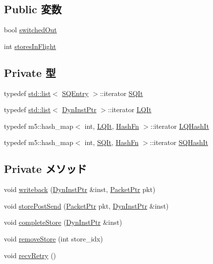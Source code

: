 \subsection*{Public 変数}
\begin{DoxyCompactItemize}
\item 
bool \hyperlink{classOzoneLWLSQ_a1aee6db9bfb75cf02e38a82e5d02847f}{switchedOut}
\item 
int \hyperlink{classOzoneLWLSQ_a04638dcfe9b4f8584453bb178bd2da5e}{storesInFlight}
\end{DoxyCompactItemize}
\subsection*{Private 型}
\begin{DoxyCompactItemize}
\item 
typedef \hyperlink{classstd_1_1list}{std::list}$<$ \hyperlink{structOzoneLWLSQ_1_1SQEntry}{SQEntry} $>$::iterator \hyperlink{classOzoneLWLSQ_a3b2dd16f487adc977c43201cd7f51558}{SQIt}
\item 
typedef \hyperlink{classstd_1_1list}{std::list}$<$ \hyperlink{classOzoneLWLSQ_a028ce10889c5f6450239d9e9a7347976}{DynInstPtr} $>$::iterator \hyperlink{classOzoneLWLSQ_a363c8c15e054d23b34f72063429933b8}{LQIt}
\item 
typedef m5::hash\_\-map$<$ int, \hyperlink{classOzoneLWLSQ_a363c8c15e054d23b34f72063429933b8}{LQIt}, \hyperlink{structOzoneLWLSQ_1_1HashFn}{HashFn} $>$::iterator \hyperlink{classOzoneLWLSQ_ac0ca3d8ca19168e251c7233ec1f9a171}{LQHashIt}
\item 
typedef m5::hash\_\-map$<$ int, \hyperlink{classOzoneLWLSQ_a3b2dd16f487adc977c43201cd7f51558}{SQIt}, \hyperlink{structOzoneLWLSQ_1_1HashFn}{HashFn} $>$::iterator \hyperlink{classOzoneLWLSQ_af476de7b08376a4d7d7cd4b8dbbabb7a}{SQHashIt}
\end{DoxyCompactItemize}
\subsection*{Private メソッド}
\begin{DoxyCompactItemize}
\item 
void \hyperlink{classOzoneLWLSQ_a3911bacb8817c31cfbeefd125dba0217}{writeback} (\hyperlink{classOzoneLWLSQ_a028ce10889c5f6450239d9e9a7347976}{DynInstPtr} \&inst, \hyperlink{classPacket}{PacketPtr} pkt)
\item 
void \hyperlink{classOzoneLWLSQ_af841afeea43eb2b2272f0dfaf17c3f4e}{storePostSend} (\hyperlink{classPacket}{PacketPtr} pkt, \hyperlink{classOzoneLWLSQ_a028ce10889c5f6450239d9e9a7347976}{DynInstPtr} \&inst)
\item 
void \hyperlink{classOzoneLWLSQ_a14bf528b217d02373076ed257f448dbf}{completeStore} (\hyperlink{classOzoneLWLSQ_a028ce10889c5f6450239d9e9a7347976}{DynInstPtr} \&inst)
\item 
void \hyperlink{classOzoneLWLSQ_ad5ff9e08c63a01ac86a8f80765b37365}{removeStore} (int store\_\-idx)
\item 
void \hyperlink{classOzoneLWLSQ_a29cb5a4f98063ce6e9210eacbdb35298}{recvRetry} ()
\end{DoxyCompactItemize}
